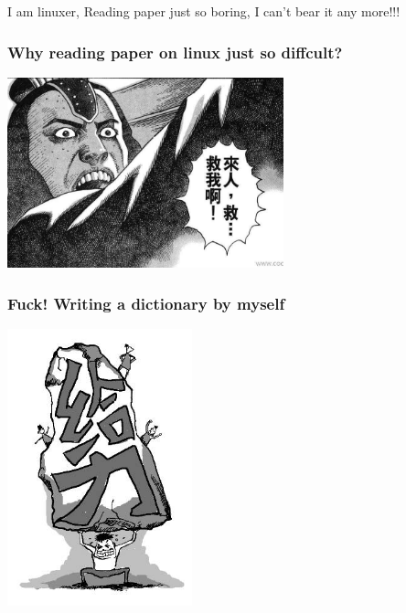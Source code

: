 \documentclass[10pt]{beamer}
\begin{document}
\begin{CJK*}{UTF8}{song}
\begin{frame}
I am linuxer, Reading paper just so boring, I can't bear it any more!!!
\end{frame}

\begin{frame}
  \frametitle{\Large{Why reading paper on linux just so diffcult?}}

\begin{center} 
  \includegraphics[width=0.6\textwidth]{help.jpg}
\end{center}

\end{frame}

\begin{frame}
  \frametitle{\Large{Fuck! Writing a dictionary by myself}}
 
\begin{center} 
  \includegraphics[width=0.4\textwidth]{geili.jpg}
  
\end{center}

\end{frame}


\end{CJK*}
\end{document}
